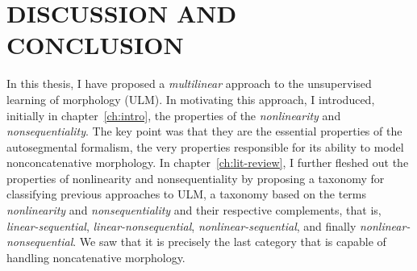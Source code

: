 \chapter{DISCUSSION AND CONCLUSION}
\label{ch:conclusion}

In this thesis, I have proposed a \emph{multilinear} approach to the unsupervised learning of morphology (ULM).
In motivating this approach, I introduced, initially in chapter~\ref{ch:intro}, the properties of the \emph{nonlinearity} 
and \emph{nonsequentiality}. The key point was that they are the 
essential properties of the autosegmental formalism, the very properties responsible for its
ability to model nonconcatenative morphology. 
In chapter~\ref{ch:lit-review}, I further fleshed out the properties of nonlinearity and nonsequentiality
by proposing a taxonomy for classifying previous approaches to ULM, 
a taxonomy based on the terms \emph{nonlinearity} 
and \emph{nonsequentiality} and their respective complements, that is, 
\emph{linear-sequential}, \emph{linear-nonsequential}, \emph{nonlinear-sequential}, 
and finally \emph{nonlinear-nonsequential}. 
We saw that it is precisely the last category that is capable of handling
noncatenative morphology. 

